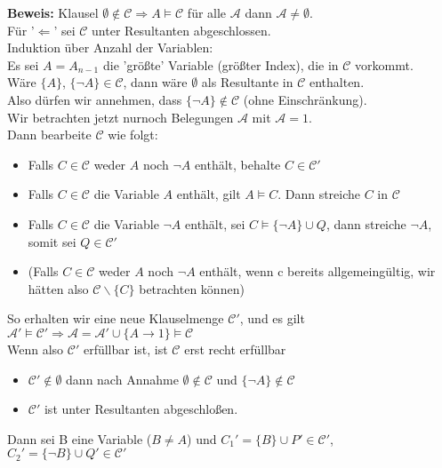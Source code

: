 \documentclass[a4paper]{scrartcl}
\begin{document}
\textbf{Beweis:} Klausel $\emptyset \notin \mathcal{C} \Rightarrow A \models \mathcal{C}$ für alle $\mathcal{A}$ dann $\mathcal{A} \neq \emptyset$.\\
Für '$\Leftarrow$' sei $\mathcal{C}$ unter Resultanten abgeschlossen. \bigskip\\
Induktion über Anzahl der Variablen:\\
Es sei $A = A_{n-1}$ die 'größte' Variable (größter Index), die in $\mathcal{C}$ vorkommt.\\
Wäre $\{A\}$, $\{\neg A\} \in \mathcal{C}$, dann wäre $\emptyset$ als Resultante in $\mathcal{C}$ enthalten.\\
Also dürfen wir annehmen, dass $\{ \neg A \} \notin \mathcal{C}$ (ohne Einschränkung).\\
Wir betrachten jetzt nurnoch Belegungen $\mathcal{A}$ mit $\mathcal{A}=1$.\\
Dann bearbeite $\mathcal{C}$ wie folgt:
\begin{itemize}
\item Falls $C \in \mathcal{C}$ weder $A$ noch $\neg A$ enthält, behalte $C \in \mathcal{C'}$
\item Falls $C \in \mathcal{C}$ die Variable $A$ enthält, gilt $A \models C$. Dann streiche $C$ in $\mathcal{C}$
\item Falls $C \in \mathcal{C}$ die Variable $\neg A$ enthält, sei $C \models \{ \neg A \} \cup Q$, dann streiche $\neg A$, somit sei $Q \in \mathcal{C'}$
\item (Falls $C \in \mathcal{C}$ weder $A$ noch $\neg A$ enthält, wenn c bereits allgemeingültig, wir hätten also $\mathcal{C}\backslash \{C\}$ betrachten können)
\end{itemize}
So erhalten wir eine neue Klauselmenge $\mathcal{C'}$, und es gilt \colorbox{light-gray}{$\mathcal{A'} \models \mathcal{C'} \Rightarrow \mathcal{A} = \mathcal{A'} \cup \{A \rightarrow 1\} \models \mathcal{C}$} \\
Wenn also $\mathcal{C'}$ erfüllbar ist, ist $\mathcal{C}$ erst recht erfüllbar
\begin{itemize}
\item $\mathcal{C'} \notin \emptyset$ dann nach Annahme $\emptyset \notin \mathcal{C}$ und $\{\neg A \} \notin \mathcal{C}$
\item $\mathcal{C'}$ ist unter Resultanten abgeschloßen.
\end{itemize} 
Dann sei B eine Variable ($B \neq A$) und \colorbox{light-gray}{$C_{1}' = \{B\} \cup P' \in \mathcal{C'}$}, \colorbox{light-gray}{$C_{2}' = \{\neg B\} \cup Q' \in \mathcal{C'}$}\bigskip\\
\end{document}
